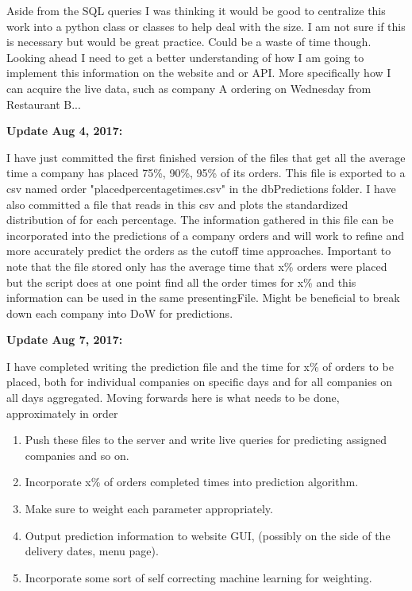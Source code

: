 \documentclass[12pt]{article}
\begin{document}
Aside from the SQL queries I was thinking it would be good to centralize this work into a python class or classes to help deal with the size. I am not sure if this is necessary but would be great practice. Could be a waste of time though.
Looking ahead I need to get a better understanding of how I am going to implement this information on the website and or API. More specifically how I can acquire the live data, such as company A ordering on Wednesday from Restaurant B...

\vspace{.25cm}

\textbf{Update Aug 4, 2017:} 


I have just committed the first finished version of the files that get all the average time a company has placed 75\%, 90\%, 95\% of its orders. This file is exported to a csv named order "placedpercentagetimes.csv" in the dbPredictions folder. I have also committed a file that reads in this csv and plots the standardized distribution of for each percentage. The information gathered in this file can be incorporated into the predictions of a company orders and will work to refine and more accurately predict the orders as the cutoff time approaches. Important to note that the file stored only has the average time that x\% orders were placed but the script does at one point find all the order times for x\% and this information can be used in the same presentingFile. Might be beneficial to break down each company into DoW for predictions. 

\vspace{.25cm}

\textbf{Update Aug 7, 2017:} 

I have completed writing the prediction file and the time for x\% of orders to be placed, both for individual companies on specific days and for all companies on all days aggregated. Moving forwards here is what needs to be done, approximately in order
\begin{enumerate}
\item Push these files to the server and write live queries for predicting assigned companies and so on.
\item Incorporate x\% of orders completed times into prediction algorithm.
\item Make sure to weight each parameter appropriately.
\item Output prediction information to website GUI, (possibly on the side of the delivery dates, menu page).
\item Incorporate some sort of self correcting machine learning for weighting. 
\end{enumerate}
\end{document}

